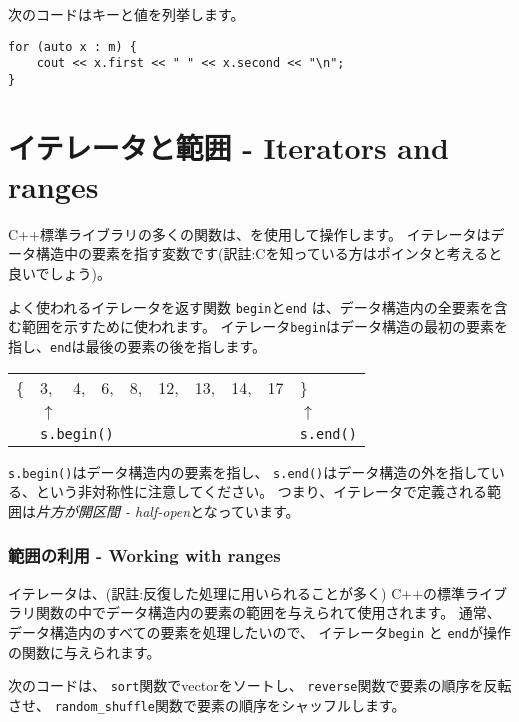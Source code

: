 次のコードはキーと値を列挙します。
\begin{lstlisting}
for (auto x : m) {
    cout << x.first << " " << x.second << "\n";
}
\end{lstlisting}

\section{イテレータと範囲 - Iterators and ranges}


C++標準ライブラリの多くの関数は、を使用して操作します。
イテレータはデータ構造中の要素を指す変数です(訳註:Cを知っている方はポインタと考えると良いでしょう)。

よく使われるイテレータを返す関数
\texttt{begin}と\texttt{end}
は、データ構造内の全要素を含む範囲を示すために使われます。
イテレータ\texttt{begin}はデータ構造の最初の要素を指し、\texttt{end}は最後の要素の後を指します。
\begin{center}
\begin{tabular}{llllllllll}
\{ & 3, & 4, & 6, & 8, & 12, & 13, & 14, & 17 & \} \\
& $\uparrow$ & & & & & & & & $\uparrow$ \\
& \multicolumn{3}{l}{\texttt{s.begin()}} & & & & & & \texttt{s.end()} \\
\end{tabular}
\end{center}

\texttt{s.begin()}はデータ構造内の要素を指し、
\texttt{s.end()}はデータ構造の外を指している、という非対称性に注意してください。
つまり、イテレータで定義される範囲は\emph{片方が開区間 - half-open}となっています。

\subsubsection{範囲の利用 - Working with ranges}

イテレータは、(訳註:反復した処理に用いられることが多く)
C++の標準ライブラリ関数の中でデータ構造内の要素の範囲を与えられて使用されます。
通常、データ構造内のすべての要素を処理したいので、
イテレータ\texttt{begin} と \texttt{end}が操作の関数に与えられます。

次のコードは、
\texttt{sort}関数でvectorをソートし、
\texttt{reverse}関数で要素の順序を反転させ、
\texttt{random\_shuffle}関数で要素の順序をシャッフルします。



